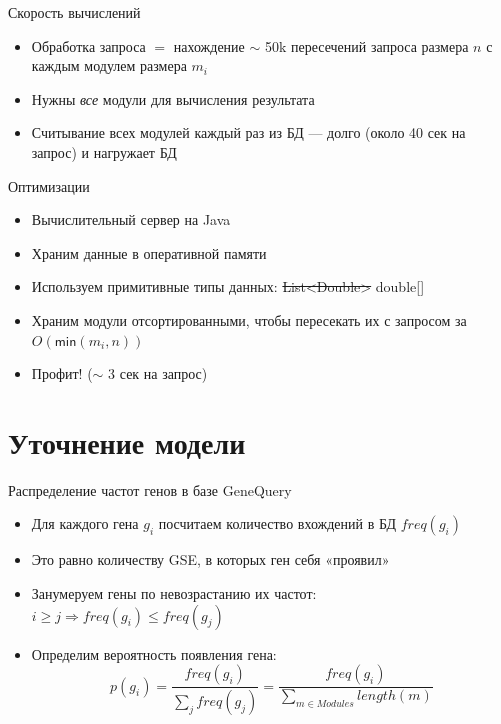 \documentclass[10pt,pdf,utf8,russian,aspectratio=169]{beamer}
\begin{document}
\begin{frame}{Скорость вычислений}
  \begin{itemize}[<+->]
    \item Обработка запроса $=$ нахождение $\sim$ 50k пересечений запроса размера $n$ с каждым модулем размера $m_i$
    \item Нужны \emph{все} модули для вычисления результата
    \item Считывание всех модулей каждый раз из БД --- долго (около 40 сек на запрос) и нагружает БД
  \end{itemize}
\end{frame}

\begin{frame}{Оптимизации}
  \begin{itemize}[<+->]
    \item Вычислительный сервер на Java
    \item Храним данные в оперативной памяти
    \item Используем примитивные типы данных: \sout{List<Double>} double[]
    \item Храним модули отсортированными, чтобы пересекать их с запросом за $O(\mathsf{min}(m_i, n))$
    \item Профит! ($\sim$ 3 сек на запрос)
  \end{itemize}
\end{frame}


\section{Уточнение модели}

\begin{frame}{Распределение частот генов в базе GeneQuery}
    \begin{itemize}[<+->]
	    \item Для каждого гена $g_i$ посчитаем количество вхождений в БД $freq(g_i)$
	    \item Это равно количеству GSE, в которых ген себя «проявил»
	    \item Занумеруем гены по невозрастанию их частот: $i \ge j \Rightarrow freq(g_i) \le freq(g_j)$
	    \item Определим вероятность появления гена: 
	        $$p(g_i) = \frac{freq(g_i)}{\sum\limits_{j}{freq(g_j)}} = \frac{freq(g_i)}{\sum\limits_{m \in Modules}{length(m)}}$$
	 \end{itemize}
\end{frame}
\end{document}
